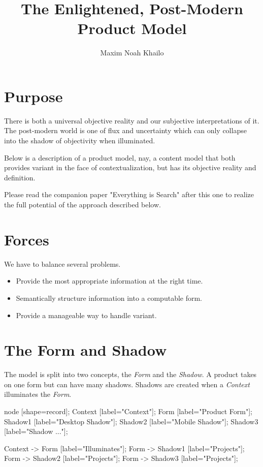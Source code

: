 \documentclass[11pt]{article}
\title{The Enlightened, Post-Modern Product Model}
\author{Maxim Noah Khailo}
\begin{document}
\maketitle
\section{Purpose}

There is both a universal objective reality and our subjective interpretations of 
it. The post-modern world is one of flux and uncertainty which can only collapse
into the shadow of objectivity when illuminated. 

Below is a description of a product model, nay, a content model that both provides
variant in the face of contextualization, but has its objective reality and definition.

Please read the companion paper "Everything is Search" after this one to realize
the full potential of the approach described below.

\section{Forces}

We have to balance several problems.

\begin{itemize}
    \item Provide the most appropriate information at the right time.
    \item Semantically structure information into a computable form.
    \item Provide a manageable way to handle variant.
\end{itemize}

\newpage
\section{The Form and Shadow}

The model is split into two concepts, the \emph{Form} and the \emph{Shadow}. 
A product takes on one form but can have many shadows. Shadows are created when
a \emph{Context} illuminates the \emph{Form}.

 {
    node [shape=record];
    Context [label="Context"];
    Form [label="Product Form"];
    Shadow1 [label="Desktop Shadow"];
    Shadow2 [label="Mobile Shadow"];
    Shadow3 [label="Shadow ..."];

    Context -> Form [label="Illuminates"];
    Form -> Shadow1 [label="Projects"];
    Form -> Shadow2 [label="Projects"];
    Form -> Shadow3 [label="Projects"];
}
\end{document}

